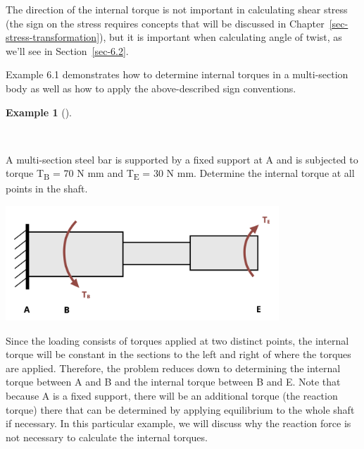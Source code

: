 \documentclass[
  letterpaper,
  DIV=11,
  numbers=noendperiod]{scrreprt}
\theoremstyle{definition}
\newtheorem{example}{Example}[chapter]
\theoremstyle{remark}
\begin{document}
The direction of the internal torque is not important in calculating
shear stress (the sign on the stress requires concepts that will be
discussed in Chapter~\ref{sec-stress-transformation}), but it is
important when calculating angle of twist, as we'll see in
Section~\ref{sec-6.2}.

Example 6.1 demonstrates how to determine internal torques in a
multi-section body as well as how to apply the above-described sign
conventions.

\begin{tcolorbox}[enhanced jigsaw, left=2mm, toptitle=1mm, breakable, coltitle=black, colbacktitle=quarto-callout-tip-color!10!white, opacitybacktitle=0.6, bottomrule=.15mm, titlerule=0mm, leftrule=.75mm, colframe=quarto-callout-tip-color-frame, bottomtitle=1mm, opacityback=0, title={Example 6.1}, arc=.35mm, colback=white, rightrule=.15mm, toprule=.15mm]

\begin{example}[]\protect\hypertarget{exm-6.1}{}\label{exm-6.1}

~

A multi-section steel bar is supported by a fixed support at A and is
subjected to torque T\textsubscript{B} = 70 N mm and T\textsubscript{E}
= 30 N mm. Determine the internal torque at all points in the shaft.

\begin{center}
\includegraphics[width=4.04167in,height=\textheight]{images/CH6 PNGs/example 6.1 part 1.png}
\end{center}

\begin{tcolorbox}[enhanced jigsaw, left=2mm, toptitle=1mm, breakable, coltitle=black, colbacktitle=quarto-callout-tip-color!10!white, opacitybacktitle=0.6, bottomrule=.15mm, titlerule=0mm, leftrule=.75mm, colframe=quarto-callout-tip-color-frame, bottomtitle=1mm, opacityback=0, title={Solution}, arc=.35mm, colback=white, rightrule=.15mm, toprule=.15mm]

Since the loading consists of torques applied at two distinct points,
the internal torque will be constant in the sections to the left and
right of where the torques are applied. Therefore, the problem reduces
down to determining the internal torque between A and B and the internal
torque between B and E. Note that because A is a fixed support, there
will be an additional torque (the reaction torque) there that can be
determined by applying equilibrium to the whole shaft if necessary. In
this particular example, we will discuss why the reaction force is not
necessary to calculate the internal torques.~


\end{tcolorbox}
\end{example}
\end{tcolorbox}
\end{document}
